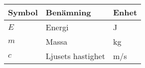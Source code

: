 \vspace{-5mm}
\begin{table}[H]
\begin{tabular}{ l l l }
\toprule
\textbf{Symbol} & \textbf{Benämning} & \textbf{Enhet} \\
\midrule
    $E$ & Energi & \si{J} \\
    $m$ & Massa & \si{kg} \\
    $c$ & Ljusets hastighet & \si{m/s} \\
\bottomrule
\end{tabular}
\end{table}